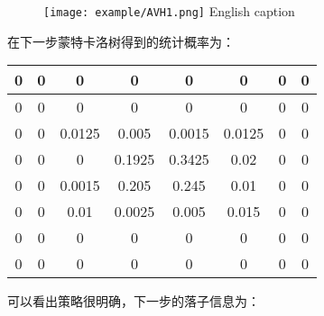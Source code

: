 \begin{figure}[!htp]
	\centering
	\texttt{[image: example/AVH1.png]}
	\hspace{0.5cm}
	{English caption}
	\label{fig:AIvsAI}
\end{figure}

在下一步蒙特卡洛树得到的统计概率为：

\begin{tabular}{|c|c|c|c|c|c|c|c|}
	\hline 
	0& 0 & 0 & 0 & 0 & 0 &  0&  0\\ 
	\hline 
	0& 0 & 0 & 0 & 0 & 0 &  0&  0\\ 
	\hline 
	0 & 0 & 0.0125 & 0.005 & 0.0015 & 0.0125 & 0 & 0 \\ 
	\hline 
	0 & 0 & 0 & 0.1925 & 0.3425 & 0.02 & 0 & 0 \\ 
	\hline 
	0 & 0 & 0.0015 & 0.205 & 0.245 & 0.01 & 0 & 0 \\ 
	\hline 
	0 & 0 & 0.01 & 0.0025 & 0.005 & 0.015 & 0 & 0 \\ 
	\hline 
	0 & 0 & 0 & 0 & 0 & 0 & 0 & 0 \\ 
	\hline 
	0 & 0 & 0 & 0 & 0 & 0 & 0 & 0 \\  
	\hline 
\end{tabular} 

可以看出策略很明确，下一步的落子信息为：

